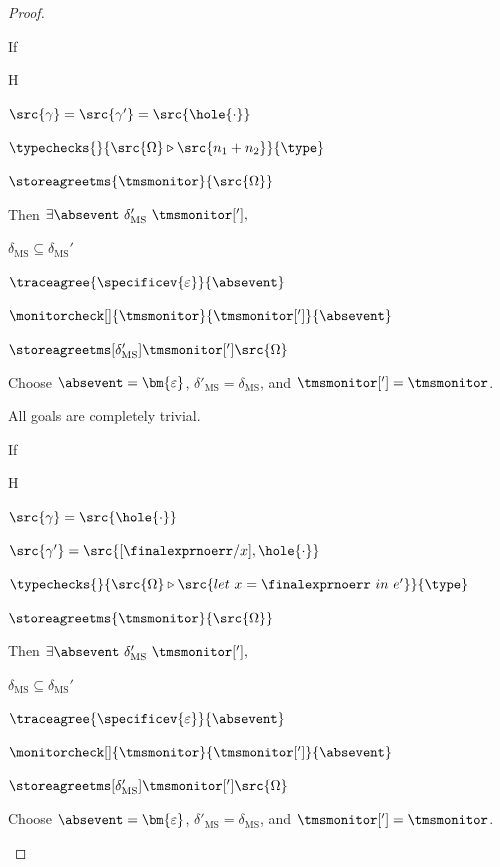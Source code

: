 \documentclass[a4paper,names,dvipsnames]{article}
\begin{document}
\begin{proof}
\begin{description}
      If
      \begin{passumptions}{H}
        \item $\src{\gamma}=\src{\gamma'}=\src{\hole{\cdot}}$
        \item $\typechecks{}{\src{\Omega}\triangleright\src{n_1+n_2}}{\type}$
        \item $\storeagreetms{\tmsmonitor}{\src{\Omega}}$
      \end{passumptions}
      Then $\exists \absevent\ \delta_{\text{MS}}'\ \tmsmonitor['],$
      \begin{goals}
        \item $\delta_{\text{MS}}\subseteq\delta_{\text{MS}}'$
        \item $\traceagree{\specificev{\varepsilon}}{\absevent}$
        \item $\monitorcheck[]{\tmsmonitor}{\tmsmonitor[']}{\absevent}$
        \item $\storeagreetms[\delta_{\text{MS}}']{\tmsmonitor[']}{\src{\Omega}}$
      \end{goals}
      Choose $\absevent=\bm{\varepsilon}$, $\delta'_{\text{MS}}=\delta_{\text{MS}}$, and $\tmsmonitor[']=\tmsmonitor$.

      All goals are completely trivial.

      If
      \begin{passumptions}{H}
        \item $\src{\gamma}=\src{\hole{\cdot}}$
        \item $\src{\gamma'}=\src{[\finalexprnoerr/x],\hole{\cdot}}$
        \item $\typechecks{}{\src{\Omega}\triangleright\src{let\ x=\finalexprnoerr\ in\ e'}}{\type}$
        \item $\storeagreetms{\tmsmonitor}{\src{\Omega}}$
      \end{passumptions}
      Then $\exists \absevent\ \delta_{\text{MS}}'\ \tmsmonitor['],$
      \begin{goals}
        \item $\delta_{\text{MS}}\subseteq\delta_{\text{MS}}'$
        \item $\traceagree{\specificev{\varepsilon}}{\absevent}$
        \item $\monitorcheck[]{\tmsmonitor}{\tmsmonitor[']}{\absevent}$
        \item $\storeagreetms[\delta_{\text{MS}}']{\tmsmonitor[']}{\src{\Omega}}$
      \end{goals}
      Choose $\absevent=\bm{\varepsilon}$, $\delta'_{\text{MS}}=\delta_{\text{MS}}$, and $\tmsmonitor[']=\tmsmonitor$.


\end{description}
\end{proof}
\end{document}
